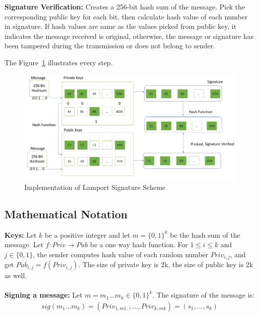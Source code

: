 \documentclass[10pt,sigconf]{acmart}
\begin{document}
\noindent\textbf{Signature Verification:} \quad Creates a 256-bit hash sum of the message. Pick the corresponding public key for each bit, then calculate hash value of each number in signature. If hash values are same as the values picked from public key, it indicates the message received is original, otherwise, the message or signature has been tampered during the transmission or does not belong to sender. 
\vspace{0.5em}

\noindent The Figure~\ref{fig:Lamport_Implementation_Details} illustrates every step.

\begin{figure}[H]
\centering
\includegraphics[scale=0.18]{Lamport_Implementation_Details.png}
\caption{\small{Implementation of Lamport Signature Scheme}}
\label{fig:Lamport_Implementation_Details}
\end{figure}


\subsection{Mathematical Notation}

\textbf{Keys:} \quad Let $k$ be a positive integer and let $m = \{0,1\}^k$ be the hash sum of the message. Let $f:Priv \to Pub$ be a one way hash function. For $1 \leq i \leq k$ and $j \in \{0,1\}$, the sender computes hash value of each random number $Priv_{i,j}$, and get $Pub_{i,j} = f (Priv_{i,j})$. The size of private key is 2k, the size of public key is 2k as well.
\\
\\
\noindent \textbf{Signing a message:} \quad Let $m = m_1 \dots m_k \in \{0,1\}^k$. The signature of the message is:
\begin{align*}
sig(m_1 \dots m_k) = (Priv_{1,m1,}, \dots , Priv_{k,mk}) = (s_1, \dots, s_k)    
\end{align*}
\end{document}
